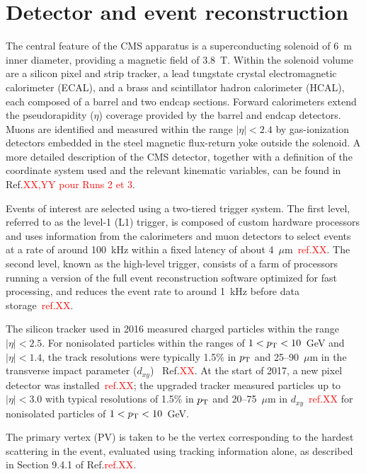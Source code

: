 \documentclass{cernatlasnote}
\newcommand{\mic}{$\mu$m\xspace}
\newcommand{\dxy}{$d_{xy}$\xspace}
\newcommand{\pt}{$p_{\text T}$\xspace}
\begin{document}
\section{Detector and event reconstruction}
\label{SEC: CMS}

The central feature of the CMS apparatus is a superconducting solenoid of 6~m inner diameter, providing a magnetic field of 3.8~T. Within the solenoid volume are a silicon pixel and strip tracker, a lead tungstate crystal electromagnetic calorimeter (ECAL), and a brass and scintillator hadron calorimeter (HCAL), each composed of a barrel and two endcap sections. Forward calorimeters extend the pseudorapidity ($\eta$) coverage provided by the barrel and endcap detectors. Muons are identified and measured within the range $|\eta| < 2.4$ by gas-ionization detectors embedded in the steel magnetic flux-return yoke outside the solenoid. A more detailed description of the CMS detector, together with a definition of the coordinate system used and the relevant kinematic variables, can be found in Ref.\textcolor{red}{XX,YY pour Runs 2 et 3}.

Events of interest are selected using a two-tiered trigger system. The first level, referred to as the level-1 (L1) trigger, is composed of custom hardware processors and uses information from the calorimeters and muon detectors to select events at a rate of around 100~kHz within a fixed latency of about 4~\mic~\textcolor{red}{ref.XX}. The second level, known as the high-level trigger, consists of a farm of processors running a version of the full event reconstruction software optimized for fast processing, and reduces the event rate to around 1~kHz before data storage~\textcolor{red}{ref.XX}.

The silicon tracker used in 2016 measured charged particles within the range $|\eta| < 2.5$. For nonisolated particles within the ranges of $1 < p_{\rm T} < 10$~GeV and $|\eta| < 1.4$, the track resolutions were typically 1.5\% in \pt and 25–90~\mic in the transverse impact parameter (\dxy) ~Ref.\textcolor{red}{XX}. At the start of 2017, a new pixel detector was installed~\textcolor{red}{ref.XX}; the upgraded tracker measured particles up to $|\eta| < 3.0$ with typical resolutions of 1.5\% in \pt and 20–75~\mic in \dxy~\textcolor{red}{ref.XX} for nonisolated particles of $1 < p_{\rm T} < 10$~GeV.

The primary vertex (PV) is taken to be the vertex corresponding to the hardest scattering in the event, evaluated using tracking information alone, as described in Section 9.4.1 of Ref.\textcolor{red}{ref.XX}.
\end{document}
